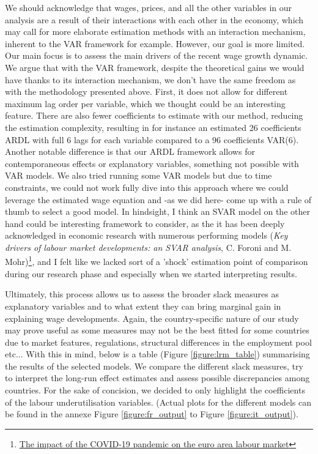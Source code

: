 We should acknowledge that wages, prices, and all the other variables in our analysis are a result of their interactions with each other in the economy, which may call for more elaborate estimation methods with an interaction mechanism, inherent to the VAR framework for example. However, our goal is more limited. 
Our main focus is to assess the main drivers of the recent wage growth dynamic. 
We argue that with the VAR framework, despite the theoretical gains we would have thanks to its interaction mechanism, we don’t have the same freedom as with the methodology presented above. 
First, it does not allow for different maximum lag order per variable, which we thought could be an interesting feature. 
There are also fewer coefficients to estimate with our method, reducing the estimation complexity, resulting in for instance an estimated 26 coefficients ARDL with full 6 lags for each variable compared to a 96 coefficients VAR(6). 
Another notable difference is that our ARDL framework allows for contemporaneous effects or explanatory variables, something not possible with VAR models. 
We also tried running some VAR models but due to time constraints, we could not work fully dive into this approach where we could leverage the estimated wage equation and -as we did here- come up with a rule of thumb to select a good model. 
In hindsight, I think an SVAR model on the other hand could be interesting framework to consider, as the it has been deeply acknowledged in economic research with numerous performing models (\textit{Key drivers of labour market developments: an SVAR analysis}, C. Foroni and M. Mohr)\footnote{\href{https://www.ecb.europa.eu/pub/economic-bulletin/articles/2021/html/ecb.ebart202008_02~bc749d90e7.en.html}{The impact of the COVID-19 pandemic on the euro area labour market}}, and I felt like we lacked sort of a 'shock' estimation point of comparison during our research phase and especially when we started interpreting results.

Ultimately, this process allows us to assess the broader slack measures as explanatory variables and to what extent they can bring marginal gain in explaining wage developments. 
Again, the country-specific nature of our study may prove useful as some measures may not be the best fitted for some countries due to market features, regulations, structural differences in the employment pool etc... 
With this in mind, below is a table (Figure \ref{figure:lrm_table}) summarising the results of the selected models. 
We compare the different slack measures, try to interpret the long-run effect estimates and assess possible discrepancies among countries. 
For the sake of concision, we decided to only highlight the coefficients of the labour underutilisation variables. (Actual plots for the different models can be found in the annexe Figure \ref{figure:fr_output} to Figure \ref{figure:it_output}).

